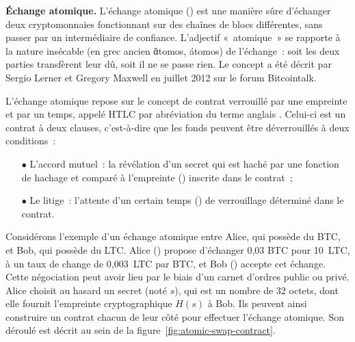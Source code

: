 
\textbf{Échange atomique.} L'échange atomique () est une manière sûre d'échanger deux cryptomonnaies fonctionnant sur des chaînes de blocs différentes, sans passer par un intermédiaire de confiance. L'adjectif «~atomique~» se rapporte à la nature insécable (en grec ancien \foreignlanguage{greek}{ἄtomos}, átomos) de l'échange~: soit les deux parties transfèrent leur dû, soit il ne se passe rien. Le concept a été décrit par Sergio Lerner et Gregory Maxwell en juillet 2012 sur le forum Bitcointalk.

L'échange atomique repose sur le concept de contrat verrouillé par une empreinte et par un temps, appelé HTLC par abréviation du terme anglais . Celui-ci est un contrat à deux clauses, c'est-à-dire que les fonds peuvent être déverrouillés à deux conditions~:

\begin{itemize}
\item[$\bullet$] L'accord mutuel~: la révélation d'un secret qui est haché par une fonction de hachage et comparé à l'empreinte () inscrite dans le contrat~;
\item[$\bullet$] Le litige~: l'attente d'un certain temps () de verrouillage déterminé dans le contrat.
\end{itemize}

%

Considérons l'exemple d'un échange atomique entre Alice, qui possède du BTC, et Bob, qui possède du LTC. Alice () propose d'échanger 0,03 BTC pour 10~LTC, à un taux de change de 0,003~LTC par BTC, et Bob () accepte cet échange. Cette négociation peut avoir lieu par le biais d'un carnet d'ordres public ou privé. Alice choisit au hasard un secret (noté $s$), qui est un nombre de 32 octets, dont elle fournit l'empreinte cryptographique $H(s)$ à Bob. Ils peuvent ainsi construire un contrat chacun de leur côté pour effectuer l'échange atomique. Son déroulé est décrit au sein de la figure~\ref{fig:atomic-swap-contract}.

